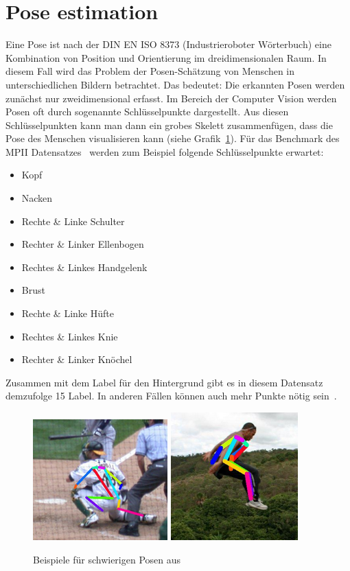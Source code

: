 \documentclass[journal, a4paper]{IEEEtran}
\begin{document}
\section{Pose estimation} \label{sec:pose_estimation}
	Eine Pose ist nach der DIN EN ISO 8373 (Industrieroboter Wörterbuch) eine Kombination von Position und Orientierung im dreidimensionalen Raum. In diesem Fall wird das Problem der Posen-Schätzung von Menschen in unterschiedlichen Bildern betrachtet. Das bedeutet: Die erkannten Posen werden zunächst nur zweidimensional erfasst. Im Bereich der Computer Vision werden Posen oft durch sogenannte Schlüsselpunkte dargestellt. Aus diesen Schlüsselpunkten kann man dann ein grobes Skelett zusammenfügen, dass die Pose des Menschen visualisieren kann (siehe Grafik~\ref{fig:hard_pose}).
        Für das Benchmark des MPII Datensatzes~\cite{MPII} 
        werden zum Beispiel folgende Schlüsselpunkte erwartet:
        \begin{itemize}
        \item Kopf 
        \item Nacken
        \item Rechte \& Linke Schulter
        \item Rechter \& Linker Ellenbogen
        \item Rechtes \& Linkes Handgelenk
        \item Brust
        \item Rechte \& Linke Hüfte
        \item Rechtes \& Linkes Knie
        \item Rechter \& Linker Knöchel
        \end{itemize}
        Zusammen mit dem Label für den Hintergrund gibt es in diesem Datensatz demzufolge 15 Label. In anderen Fällen können auch mehr Punkte nötig sein~\cite{COCO 2018 Keypoint Detection Task}.
        \begin{figure}[!hbt]
                \includegraphics[width=0.4\columnwidth]{hardpose_1.png}
                \includegraphics[width=0.35\columnwidth]{hardpose_2.png}
                \caption{Beispiele für schwierigen Posen aus~\cite{DeepPose: Human Pose Estimation via Deep Neural Networks}}
                \label{fig:hard_pose}
        \end{figure}
\end{document}
